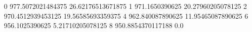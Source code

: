 0 977.5072021484375 26.62176513671875
1 971.1650390625 20.27960205078125
2 970.4512939453125 19.56585693359375
4 962.840087890625 11.95465087890625
6 956.1025390625 5.21710205078125
8 950.8854370117188 0.0
